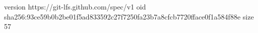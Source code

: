 version https://git-lfs.github.com/spec/v1
oid sha256:93ce59b0b2be01f5ad833592c27f7250fa23b7a8cfcb7720fface0f1a584f88e
size 57
